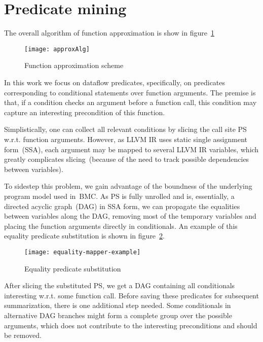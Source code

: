 \section{Predicate mining}\label{sec:mining}

The overall algorithm of function approximation is show in figure~\ref{fig:approxAlg}
\begin{figure}[H]
\centering
\caption{Function approximation scheme}
\label{fig:approxAlg}
\texttt{[image: approxAlg]}
\end{figure}


In this work we focus on dataflow predicates, specifically, on predicates corresponding to conditional statements over function arguments. The premise is that, if a condition checks an argument before a function call, this condition may capture an interesting precondition of this function.

Simplistically, one can collect all relevant conditions by slicing the call site PS w.r.t. function arguments. However, as LLVM IR uses static single assignment form~(SSA), each argument may be mapped to several LLVM IR variables, which greatly complicates slicing~(because of the need to track possible dependencies between variables).

To sidestep this problem, we gain advantage of the boundness of the underlying program model used in~BMC. As PS is fully unrolled and is, essentially, a directed acyclic graph~(DAG) in SSA form, we can propagate the equalities between variables along the DAG, removing most of the temporary variables and placing the function arguments directly in conditionals. An example of this equality predicate substitution is shown in figure~\ref{fig:equality-mapper-example}.

\begin{figure}[tbh]
\centering
\caption{Equality predicate substitution}
\label{fig:equality-mapper-example}
\texttt{[image: equality-mapper-example]}
\end{figure}

After slicing the substituted PS, we get a DAG containing all conditionals interesting w.r.t. some function call. Before saving these predicates for subsequent summarization, there is one additional step needed. Some conditionals in alternative DAG branches might form a complete group over the possible arguments, which does not contribute to the interesting preconditions and should be removed.

